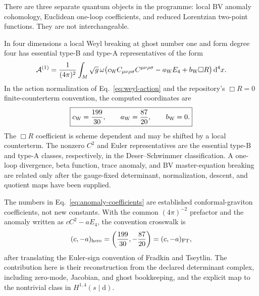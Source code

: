 \documentclass[11pt]{article}
\newcommand{\dd}{\mathrm d}
\begin{document}
There are three separate quantum objects in the programme: local BV anomaly
cohomology, Euclidean one-loop coefficients, and reduced Lorentzian
two-point functions.  They are not interchangeable.

In four dimensions a local Weyl breaking at ghost number one and form degree
four has essential type-B and type-A representatives of the form
\begin{equation}
 \mathcal A^{(1)}
 =\frac1{(4\pi)^2}\int_M\sqrt g\,\omega
 \bigl(c_{\rm W}C_{\mu\nu\rho\sigma}C^{\mu\nu\rho\sigma}
       -a_{\rm W}E_4+b_{\rm W}\Box R\bigr)\,\dd^4x .
 \label{eq:anomaly}
\end{equation}
In the action normalization of Eq.~\eqref{eq:weyl-action} and the repository's
$\Box R=0$ finite-counterterm convention, the computed coordinates are
\begin{equation}
 \boxed{c_{\rm W}=\frac{199}{30},\qquad
        a_{\rm W}=\frac{87}{20},\qquad b_{\rm W}=0.}
 \label{eq:anomaly-coefficients}
\end{equation}
The $\Box R$ coefficient is scheme dependent and may be shifted by a local
counterterm.  The nonzero $C^2$ and Euler representatives are the essential
type-B and type-A classes, respectively, in the Deser--Schwimmer
classification\cite{DeserSchwimmer}.  A one-loop divergence, beta function,
trace anomaly, and BV
master-equation breaking are related only after the gauge-fixed determinant,
normalization, descent, and quotient maps have been supplied.

The numbers in Eq.~\eqref{eq:anomaly-coefficients} are established
conformal-graviton coefficients, not new constants.  With the common
$(4\pi)^{-2}$ prefactor and the anomaly written as $cC^2-aE_4$, the convention
crosswalk is
\begin{equation}
 (c,-a)_{\rm here}=\left(\frac{199}{30},-\frac{87}{20}\right)
                  =(c,-a)_{\rm FT},
 \label{eq:anomaly-convention-crosswalk}
\end{equation}
after translating the Euler-sign convention of Fradkin and
Tseytlin\cite{FradkinTseytlin1984}.  The contribution here is their
reconstruction from the declared determinant complex, including zero-mode,
Jacobian, and ghost bookkeeping, and the explicit map to the nontrivial
class in $H^{1,4}(s\mid\dd)$.
\end{document}
